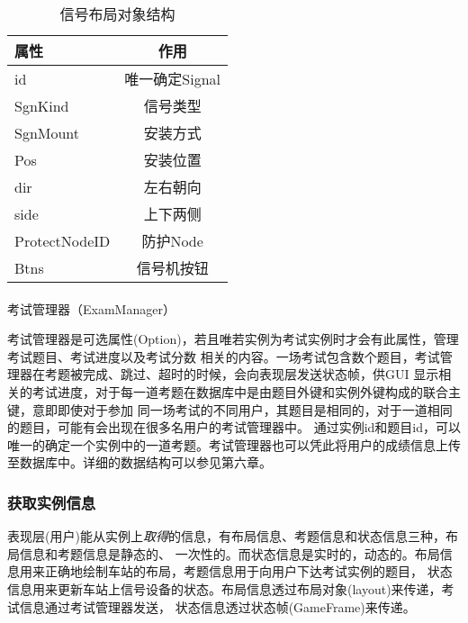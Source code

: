 \begin{table}[htpb!]
    \centering
    \caption{\label{sgn_data}信号布局对象结构}
    \begin{threeparttable}
        \begin{tabular}{lc}
            \toprule
            属性          & 作用           \\
            \midrule
            id            & 唯一确定Signal \\
            SgnKind       & 信号类型       \\
            SgnMount      & 安装方式       \\
            Pos           & 安装位置       \\
            dir           & 左右朝向       \\
            side          & 上下两侧       \\
            ProtectNodeID & 防护Node       \\
            Btns          & 信号机按钮     \\
            \bottomrule
        \end{tabular}
    \end{threeparttable}
\end{table}

\paragraph{}考试管理器（ExamManager）

考试管理器是可选属性(Option)，若且唯若实例为考试实例时才会有此属性，管理考试题目、考试进度以及考试分数
相关的内容。一场考试包含数个题目，考试管理器在考题被完成、跳过、超时的时候，会向表现层发送状态帧，供GUI
显示相关的考试进度，对于每一道考题在数据库中是由题目外键和实例外键构成的联合主键，意即即使对于参加
同一场考试的不同用户，其题目是相同的，对于一道相同的题目，可能有会出现在很多名用户的考试管理器中。
通过实例id和题目id，可以唯一的确定一个实例中的一道考题。考试管理器也可以凭此将用户的成绩信息上传
至数据库中。详细的数据结构可以参见第六章。

\subsubsection{获取实例信息}
表现层(用户)能从实例上\emph{取得}的信息，有布局信息、考题信息和状态信息三种，布局信息和考题信息是静态的、
一次性的。而状态信息是实时的，动态的。布局信息用来正确地绘制车站的布局，考题信息用于向用户下达考试实例的题目，
状态信息用来更新车站上信号设备的状态。布局信息透过布局对象(layout)来传递，考试信息通过考试管理器发送，
状态信息透过状态帧(GameFrame)来传递。

